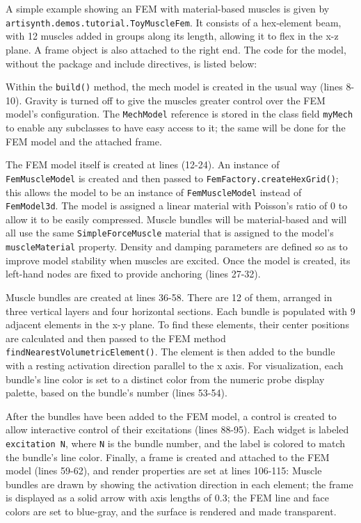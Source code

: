 A simple example showing an FEM with material-based muscles is given by {\tt
artisynth.demos.tutorial.ToyMuscleFem}. It consists of a hex-element beam, with
12 muscles added in groups along its length, allowing it to flex in the x-z
plane. A frame object is also attached to the right end. The code for the
model, without the package and include directives, is listed below:
%
\lstset{numbers=left}
\iflatexml

\else

\fi
\lstset{numbers=none}
%

Within the {\tt build()} method, the mech model is created in the usual way
(lines 8-10). Gravity is turned off to give the muscles greater control over
the FEM model's configuration. The {\tt MechModel} reference is stored in the
class field {\tt myMech} to enable any subclasses to have easy access to it;
the same will be done for the FEM model and the attached frame.

The FEM model itself is created at lines (12-24). An instance of {\tt
FemMuscleModel} is created and then passed to {\tt FemFactory.createHexGrid()};
this allows the model to be an instance of {\tt FemMuscleModel} instead of {\tt
FemModel3d}.  The model is assigned a linear material with Poisson's ratio of 0
to allow it to be easily compressed. Muscle bundles will be material-based and
will all use the same {\tt SimpleForceMuscle} material that is assigned to the
model's {\tt muscleMaterial} property. Density and damping parameters are
defined so as to improve model stability when muscles are excited.  Once the
model is created, its left-hand nodes are fixed to provide anchoring (lines
27-32).

Muscle bundles are created at lines 36-58. There are 12 of them, arranged in
three vertical layers and four horizontal sections. Each bundle is populated
with 9 adjacent elements in the x-y plane. To find these elements, their center
positions are calculated and then passed to the FEM method {\tt
findNearestVolumetricElement()}. The element is then added to the bundle with a
resting activation direction parallel to the x axis. For visualization, each
bundle's line color is set to a distinct color from the numeric probe display
palette, based on the bundle's number (lines 53-54).

After the bundles have been added to the FEM model, a control is created to
allow interactive control of their excitations (lines 88-95). Each widget is
labeled {\tt excitation N}, where {\tt N} is the bundle number, and the label
is colored to match the bundle's line color.  Finally, a frame is created and
attached to the FEM model (lines 59-62), and render properties are set at lines
106-115: Muscle bundles are drawn by showing the activation direction in each
element; the frame is displayed as a solid arrow with axis lengths of 0.3; the
FEM line and face colors are set to blue-gray, and the surface is rendered and
made transparent.

